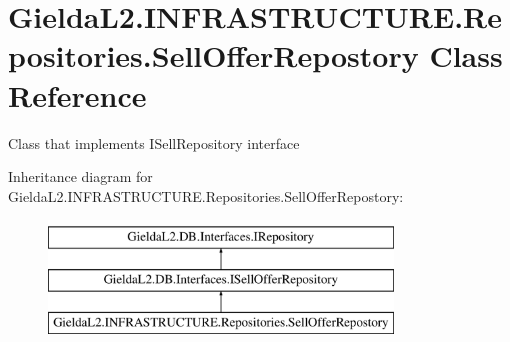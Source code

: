 \hypertarget{class_gielda_l2_1_1_i_n_f_r_a_s_t_r_u_c_t_u_r_e_1_1_repositories_1_1_sell_offer_repostory}{}\section{Gielda\+L2.\+I\+N\+F\+R\+A\+S\+T\+R\+U\+C\+T\+U\+R\+E.\+Repositories.\+Sell\+Offer\+Repostory Class Reference}
\label{class_gielda_l2_1_1_i_n_f_r_a_s_t_r_u_c_t_u_r_e_1_1_repositories_1_1_sell_offer_repostory}


Class that implements I\+Sell\+Repository interface  


Inheritance diagram for Gielda\+L2.\+I\+N\+F\+R\+A\+S\+T\+R\+U\+C\+T\+U\+R\+E.\+Repositories.\+Sell\+Offer\+Repostory\+:\begin{figure}[H]
\begin{center}
\leavevmode
\includegraphics[height=3.000000cm]{class_gielda_l2_1_1_i_n_f_r_a_s_t_r_u_c_t_u_r_e_1_1_repositories_1_1_sell_offer_repostory}
\end{center}
\end{figure}
